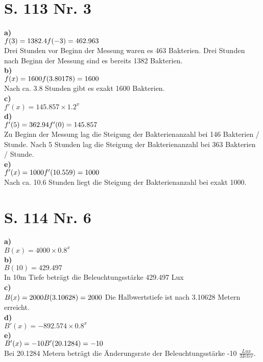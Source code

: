 \documentclass[12pt, a4paper]{report}
\begin{document}
	\chapter{S. 113 Nr. 3}
	\textbf{a)} \\
	$f(3) = 1382.4 \\ f(-3) = 462.963$ \\
	Drei Stunden vor Beginn der Messung waren es 463 Bakterien.
	Drei Stunden nach Beginn der Messung sind es bereits 1382 Bakterien. \\
	\textbf{b)} \\
	$f(x) = 1600 \\ f(3.80178) = 1600$ \\
	Nach ca. 3.8 Stunden gibt es exakt 1600 Bakterien. \\
	\textbf{c)} \\
	$f'(x) = 145.857 \times 1.2^x$ \\
	\textbf{d)} \\
	$f'(5) = 362.94 \\ f'(0) = 145.857$ \\
	Zu Beginn der Messung lag die Steigung der Bakterienanzahl bei 146 Bakterien / Stunde.
	Nach 5 Stunden lag die Steigung der Bakterienanzahl bei 363 Bakterien / Stunde.\\
	\textbf{e)} \\
	$f'(x) = 1000 \\ f'(10.559) = 1000$ \\
	Nach ca. 10.6 Stunden liegt die Steigung der Bakterienanzahl bei exakt 1000.
	\chapter{S. 114 Nr. 6}
	\textbf{a)} \\
	$B(x) = 4000 \times 0.8^x$ \\
	\textbf{b)} \\
	$B(10) = 429.497$ \\
	In 10m Tiefe beträgt die Beleuchtungsstärke 429.497 Lux \\
	\textbf{c)} \\
	$B(x) = 2000 \\ B(3.10628) = 2000 \\$
	Die Halbwertstiefe ist nach 3.10628 Metern erreicht. \\
	\textbf{d)} \\
	$B'(x) = -892.574 \times 0.8^x$ \\
	\textbf{e)} \\
	$B'(x) = -10 \\ B'(20.1284) = -10$ \\
	Bei 20.1284 Metern beträgt die Änderungsrate der Beleuchtungsstärke -10 $\frac{Lux}{Meter}$.
\end{document}

